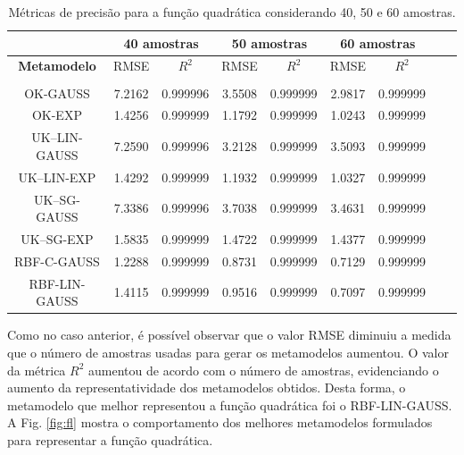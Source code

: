 \begin{table}[H]
	\centering
	\caption{Métricas de precisão para a função quadrática considerando 40, 50 e 60 amostras.} \label{tab:6} 
	\begin{tabular}{c c c c c c c c c}
		\toprule
		& \multicolumn{2}{c}{\bf 40 amostras} & \multicolumn{2}{c}{\bf 50 amostras} & \multicolumn{2}{c}{\bf 60 amostras} \\ \midrule
		{\bf Metamodelo} & RMSE & {\bf $R^{2}$} & RMSE & {\bf $R^{2}$} & RMSE & {\bf $R^{2}$} \\
		\hline \\
		{OK-GAUSS} & 7.2162 & 0.999996  & 3.5508 & 0.999999 & 2.9817 & 0.999999  \\[4pt]
		OK-EXP & 1.4256	& 0.999999 & 1.1792	& 0.999999 & 1.0243	& 0.999999  \\[4pt]                 
		UK–LIN-GAUSS & 7.2590 & 0.999996 & 3.2128 & 0.999999 & 3.5093 & 0.999999   \\[4pt]
		UK–LIN-EXP & 1.4292	& 0.999999 & 1.1932 & 0.999999 & 1.0327 & 0.999999   \\[4pt]
		UK–SG-GAUSS & 7.3386 & 0.999996 & 3.7038 & 0.999999 & 3.4631 & 0.999999  \\[4pt]
		UK–SG-EXP & 1.5835	& 0.999999 & 1.4722 & 0.999999 & 1.4377 & 0.999999  \\[4pt]
		RBF-C-GAUSS & 1.2288 & 0.999999 & 0.8731 &	0.999999 & 0.7129 &	0.999999 \\[4pt]
		RBF-LIN-GAUSS & 1.4115 & 0.999999 & 0.9516 & 0.999999 & 0.7097 & 0.999999  \\[4pt] \bottomrule
		
	\end{tabular}
\end{table}


Como no caso anterior, é possível observar que o valor RMSE diminuiu a medida que o número de amostras usadas para gerar os metamodelos aumentou. O valor da métrica $R^2$ aumentou de acordo com o número de amostras, evidenciando o aumento da representatividade dos metamodelos obtidos. Desta forma, o metamodelo que melhor representou a função quadrática foi o RBF-LIN-GAUSS. A Fig. \ref{fig:fl} mostra o comportamento dos melhores metamodelos formulados para representar a função quadrática.

